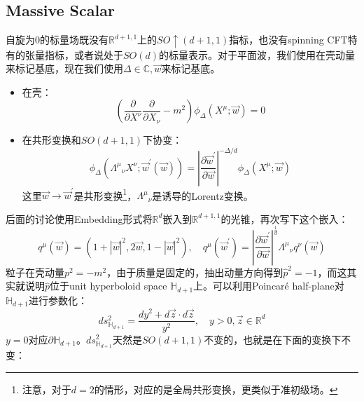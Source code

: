 \subsection{Massive Scalar}
\begin{definition}
自旋为$0$的标量场既没有$\mathbb{R}^{d+1,1}$上的$SO\uparrow(d+1,1)$指标，也没有spinning CFT特有的张量指标，或者说处于$SO(d)$的标量表示。对于平面波，我们使用在壳动量来标记基底，现在我们使用$\Delta\in\mathbb{C},\vec{w}$来标记基底。
\begin{itemize}
	\item 在壳：
	\begin{equation}
		\left(\frac{\partial}{\partial X^{\nu}} \frac{\partial}{\partial X_{\nu}}-m^{2}\right) \phi_{\Delta}\left(X^{\mu} ; \vec{w}\right)=0
	\end{equation}
	\item 在共形变换和$SO(d+1,1)$下协变：
	\begin{equation}
		\phi_{\Delta}\left({\Lambda^{\mu}}_{\nu} X^{\nu} ; \vec{w}^{\prime}(\vec{w})\right)=\left|\frac{\partial \vec{w}^{\prime}}{\partial \vec{w}}\right|^{-\Delta / d} \phi_{\Delta}\left(X^{\mu} ; \vec{w}\right)
	\end{equation}
	这里$\vec{w}\to\vec{w}^\prime$是共形变换\footnote{注意，对于$d=2$的情形，对应的是全局共形变换，更类似于准初级场。}，${\Lambda^\mu}_\nu$是诱导的Lorentz变换。
\end{itemize}
\end{definition}
后面的讨论使用Embedding形式将$\mathbb{R}^{d}$嵌入到$\mathbb{R}^{d+1,1}$的光锥，再次写下这个嵌入：
\begin{equation}
	q^\mu(\vec{w})=\left(1+|\vec{w}|^2,2\vec{w},1-|\vec{w}|^2\right),\quad q^\mu(\vec{w}^\prime)=\left|\frac{\partial \vec{w}^\prime}{\partial\vec{w}}\right|^{\frac{1}{d}}{\Lambda^\mu}_\nu q^\nu(\vec{w})
\end{equation}
粒子在壳动量$p^2=-m^2$，由于质量是固定的，抽出动量方向得到$\hat p^2=-1$，而这其实就说明$\hat p$位于unit hyperboloid space $\mathbb{H}_{d+1}$上。可以利用Poincar\'e half-plane对$\mathbb{H}_{d+1}$进行参数化：
\begin{equation}
	ds^2_{\mathbb{H}_{d+1}}=\frac{dy^2+d\vec{z}\cdot d\vec{z}}{y^2},\quad y>0,\vec{z}\in\mathbb{R}^d
\end{equation}
$y=0$对应$\partial\mathbb{H}_{d+1}$。$ds^2_{\mathbb{H}_{d+1}}$天然是$SO(d+1,1)$不变的，也就是在下面的变换下不变：
